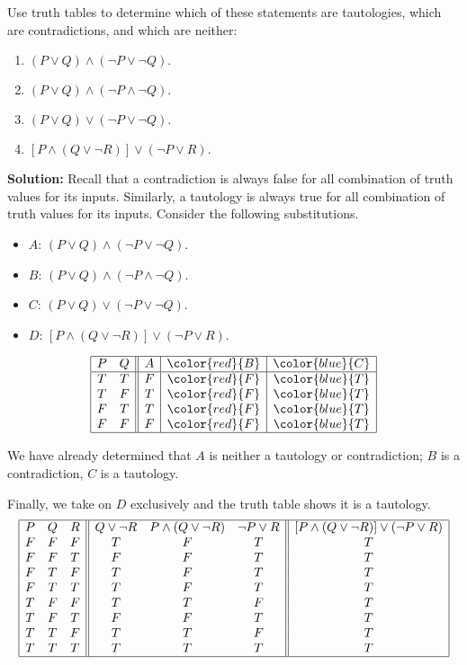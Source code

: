 Use truth tables to determine which of these statements are tautologies, which are contradictions, and which are neither:
\begin{enumerate}[label=(\alph*)]
    \item $(P \vee Q) \wedge (\neg P \vee \neg Q).$
    \item $(P \vee Q) \wedge (\neg P \wedge \neg Q).$
    \item $(P \vee Q) \vee (\neg P \vee \neg Q).$
    \item $[P \wedge (Q \vee \neg R)] \vee (\neg P \vee R).$
\end{enumerate}

\textbf{Solution:} Recall that a contradiction is always false for all combination of truth values for its inputs. Similarly, a tautology is always true for all combination of truth values for its inputs.
Consider the following substitutions.
\begin{itemize}
    \item $A$: $(P \vee Q) \wedge (\neg P \vee \neg Q)$.
    \item $B$: $(P \vee Q) \wedge (\neg P \wedge \neg Q)$.
    \item $C$: $(P \vee Q) \vee (\neg P \vee \neg Q)$.
    \item $D$: $[P \wedge (Q \vee \neg R)] \vee (\neg P \vee R)$.
\end{itemize}

\[
\begin{array}{|cc||c|c|c|}
\hline
P & Q & A & \color{red}{B} & \color{blue}{C} \\
\hline
T & T & F & \color{red}{F} & \color{blue}{T} \\
T & F & T & \color{red}{F} & \color{blue}{T} \\
F & T & T & \color{red}{F} & \color{blue}{T} \\
F & F & F & \color{red}{F} & \color{blue}{T} \\
\hline
\end{array}
\]

We have already determined that $A$ is neither a tautology or contradiction; $B$ is a contradiction, $C$ is a tautology. \

Finally, we take on $D$ exclusively and the truth table shows it is a tautology.
\[
\begin{array}{|ccc||ccc||c|}
\hline
P & Q & R & Q \vee \neg R & P \wedge (Q \vee \neg R) & \neg P \vee R & [P \wedge (Q \vee \neg R)] \vee (\neg P \vee R)\\
F & F & F & T & F & T & T \\
F & F & T & F & F & T & T \\
F & T & F & T & F & T & T \\
F & T & T & T & F & T & T \\
T & F & F & T & T & F & T \\
T & F & T & F & F & T & T \\
T & T & F & T & T & F & T \\
T & T & T & T & T & T & T \\
\hline
\end{array}
\]

\pagebreak
